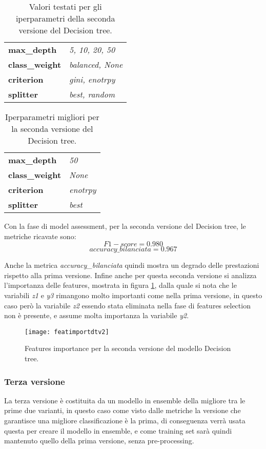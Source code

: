\begin{table}[h] 
\centering
\begin{tabular}{l l}
\hline
\textbf{max\_depth} & \textit{5, 10, 20, 50}\\
\textbf{class\_weight} & \textit{balanced, None}\\
\textbf{criterion} & \textit{gini, enotrpy}\\
\textbf{splitter} & \textit{best, random}\\
\hline
\end{tabular}
\caption{Valori testati per gli iperparametri della seconda versione del Decision tree.}
\label{tab:valdtv2}
\end{table}

\begin{table}[h] 
\centering
\begin{tabular}{l l}
\hline
\textbf{max\_depth} & \textit{50}\\
\textbf{class\_weight} & \textit{None}\\
\textbf{criterion} & \textit{enotrpy}\\
\textbf{splitter} & \textit{best}\\
\hline
\end{tabular}
\caption{Iperparametri migliori per la seconda versione del Decision tree.}
\label{tab:dtv2}
\end{table}

Con la fase di model assessment, per la seconda versione del Decision tree, le metriche ricavate sono:
$$F1-score = 0.980$$
$$accuracy\_bilanciata = 0.967$$

Anche la metrica \textit{accuracy\_bilanciata} quindi mostra un degrado delle prestazioni rispetto alla prima versione.
Infine anche per questa seconda versione si analizza l'importanza delle features, mostrata in figura \ref{fig:featuresimportancedtv2}, dalla quale si nota che le variabili \textit{z1} e \textit{y3} rimangono molto importanti come nella prima versione, in questo caso però la variabile \textit{z2} essendo stata eliminata nella fase di features selection non è presente, e assume molta importanza la variabile \textit{y2}.

\begin{figure}[h]
    \centering\texttt{[image: featimportdtv2]}
    \caption{Features importance per la seconda versione del modello Decision tree.}
    \label{fig:featuresimportancedtv2}
\end{figure}

\subsubsection{Terza versione}
La terza versione è costituita da un modello in ensemble della migliore tra le prime due varianti, in questo caso come visto dalle metriche la versione che garantisce una migliore classificazione è la prima, di conseguenza verrà usata questa per creare il modello in ensemble, e come training set sarà quindi mantenuto quello della prima versione, senza pre-processing.

